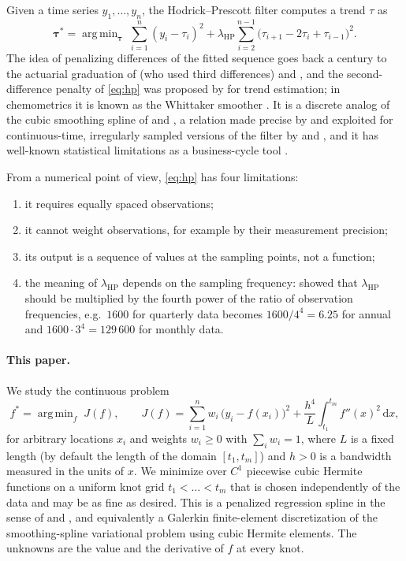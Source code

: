 \documentclass[11pt,a4paper]{article}
\theoremstyle{definition}
\theoremstyle{remark}
\DeclareMathOperator*{\argmin}{arg\,min}
\newcommand{\dd}{\,\mathrm{d}}
\begin{document}
Given a time series $y_1,\dots,y_n$, the Hodrick--Prescott filter \citep{HodrickPrescott1997} computes a trend $\tau$ as
\begin{equation}
\label{eq:hp}
\boldsymbol{\tau}^*=\argmin_{\boldsymbol{\tau}}\;\sum_{i=1}^{n}(y_i-\tau_i)^2+\lambda_{\mathrm{HP}}\sum_{i=2}^{n-1}\bigl(\tau_{i+1}-2\tau_i+\tau_{i-1}\bigr)^2 .
\end{equation}
The idea of penalizing differences of the fitted sequence goes back a century to the actuarial graduation of \citet{Whittaker1922} (who used third differences) and \citet{Henderson1924}, and the second-difference penalty of \eqref{eq:hp} was proposed by \citet{Leser1961} for trend estimation; in chemometrics it is known as the Whittaker smoother \citep{Eilers2003}. It is a discrete analog of the cubic smoothing spline of \citet{Schoenberg1964} and \citet{Reinsch1967}, a relation made precise by \citet{PaigeTrindade2010} and exploited for continuous-time, irregularly sampled versions of the filter by \citet{IannacconeOtranto2003} and \citet{McElroyTrimbur2007}, and it has well-known statistical limitations as a business-cycle tool \citep{Hamilton2018,PhillipsShi2021}.

From a numerical point of view, \eqref{eq:hp} has four limitations:
\begin{enumerate}[label=(\roman*)]
\item it requires equally spaced observations;
\item it cannot weight observations, for example by their measurement precision;
\item its output is a sequence of values at the sampling points, not a function;
\item the meaning of $\lambda_{\mathrm{HP}}$ depends on the sampling frequency: \citet{RavnUhlig2002} showed that $\lambda_{\mathrm{HP}}$ should be multiplied by the fourth power of the ratio of observation frequencies, e.g.\ $1600$ for quarterly data becomes $1600/4^4=6.25$ for annual and $1600\cdot 3^4=129\,600$ for monthly data.
\end{enumerate}

\paragraph{This paper.} We study the continuous problem
\begin{equation}
\label{eq:objective}
f^*=\argmin_{f}\;J(f),\qquad J(f)=\sum_{i=1}^{n}w_i\,\bigl(y_i-f(x_i)\bigr)^2+\frac{h^4}{L}\int_{t_1}^{t_m}f''(x)^2\dd x ,
\end{equation}
for arbitrary locations $x_i$ and weights $w_i\ge 0$ with $\sum_i w_i=1$, where $L$ is a fixed length (by default the length of the domain $[t_1,t_m]$) and $h>0$ is a bandwidth measured in the units of $x$. We minimize over $C^1$ piecewise cubic Hermite functions on a uniform knot grid $t_1<\dots<t_m$ that is chosen independently of the data and may be as fine as desired. This is a penalized regression spline in the sense of \citet{OSullivan1986} and \citet{EilersMarx1996}, and equivalently a Galerkin finite-element discretization of the smoothing-spline variational problem using cubic Hermite elements. The unknowns are the value and the derivative of $f$ at every knot.
\end{document}
